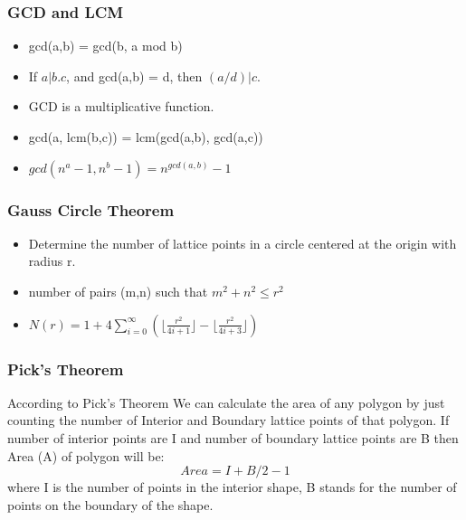 \subsubsection{GCD and LCM}
\vspace{2.5mm}
\begin{itemize}
    \item gcd(a,b) = gcd(b, a mod b)
    \item If $a | b.c$, and gcd(a,b) = d, then $(a/d)|  c$.
    \item GCD is a multiplicative function.
    \item gcd(a, lcm(b,c)) = lcm(gcd(a,b), gcd(a,c))
    \item $gcd(n^a - 1, n^b - 1) = n^{gcd(a,b)} - 1$
\end{itemize}

\subsubsection{Gauss Circle Theorem}
\vspace{2.5mm}
\begin{itemize}
    \item Determine the number of lattice points in a circle centered at the origin with radius r.
    \item number of pairs (m,n) such that $m^2+n^2\leq r^2$
    \item $N(r) = 1+4\sum\limits_{i=0}^{\infty}(\lfloor\frac{r^2}{4i+1}\rfloor - \lfloor\frac{r^2}{4i+3}\rfloor)$
\end{itemize}
\subsubsection{Pick's Theorem}
\vspace{2.5mm}
According to Pick’s Theorem We can calculate the area of any polygon by just counting the number of Interior and Boundary lattice points of that polygon. If number of interior points are I and number of boundary lattice points are B then Area (A) of polygon will be:$$Area = I + B/2 - 1$$where I is the number of points in the interior shape, B stands for the number of points on the boundary of the shape.
